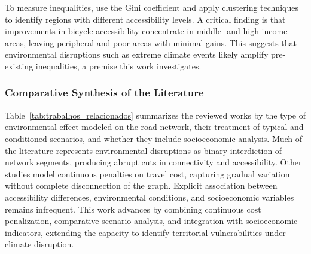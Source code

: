 To measure inequalities, \cite{PRITCHARD2019386} use the Gini coefficient and apply clustering techniques to identify regions with different accessibility levels. A critical finding is that improvements in bicycle accessibility concentrate in middle- and high-income areas, leaving peripheral and poor areas with minimal gains. This suggests that environmental disruptions such as extreme climate events likely amplify pre-existing inequalities, a premise this work investigates.

\subsubsection{Comparative Synthesis of the Literature}


Table~\ref{tab:trabalhos_relacionados} summarizes the reviewed works by the type of environmental effect modeled on the road network, their treatment of typical and conditioned scenarios, and whether they include socioeconomic analysis. Much of the literature represents environmental disruptions as binary interdiction of network segments, producing abrupt cuts in connectivity and accessibility. Other studies model continuous penalties on travel cost, capturing gradual variation without complete disconnection of the graph. Explicit association between accessibility differences, environmental conditions, and socioeconomic variables remains infrequent. This work advances by combining continuous cost penalization, comparative scenario analysis, and integration with socioeconomic indicators, extending the capacity to identify territorial vulnerabilities under climate disruption.

